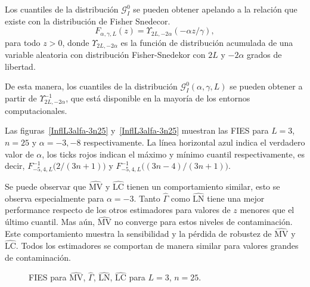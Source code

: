 Los cuantiles de la distribución $\mathcal{G}_I^0$ se pueden obtener apelando a la relación que existe con la distribución de Fisher Snedecor.
\begin{equation}
F_{\alpha,\gamma,L}(z) = \Upsilon_{2L, -2\alpha}(-\alpha  z / \gamma),
\label{eq:CDFG0}
\end{equation}
para todo $z>0$, donde $\Upsilon_{2L, -2\alpha}$ es la función de distribución acumulada de una variable aleatoria con distribución Fisher-Snedekor con $2L$ y $-2\alpha$ grados de libertad.

De esta manera, los cuantiles de la distribución $\mathcal{G}_I^0(\alpha,\gamma,L)$ se pueden obtener a partir de $\Upsilon^{-1}_{2L,-2\alpha}$, que está disponible en la mayoría de los entornos computacionales.

Las figuras~\ref{InflL3alfa-3n25} y~\ref{InflL3alfa-3n25} muestran las FIES para $L=3$, $n=25$ y $\alpha=-3, -8$ respectivamente. La línea horizontal azul indica el verdadero valor de $\alpha$, los ticks rojos indican el máximo y mínimo cuantil respectivamente, es decir, $F^{-1}_{-5,4,L}\big(2/(3n+1)\big)$ y $F^{-1}_{-5,4,L}\big((3n-4)/(3n+1)\big)$. 

Se puede observar que $\widehat{\text{MV}}$ y $\widehat{\text{LC}}$ tienen un comportamiento similar, esto se observa especialmente para $\alpha=-3$. Tanto $\widehat{\Gamma}$ como $\widehat{\text{LN}}$ tiene una mejor performance respecto de los otros estimadores para valores de $z$ menores que el último cuantil. Mas aún, $\widehat{\text{MV}}$ no converge para estos niveles de contaminación. Este comportamiento muestra la sensibilidad y la pérdida de robustez de $\widehat{\text{MV}}$ y $\widehat{\text{LC}}$. Todos los estimadores se comportan de manera similar para valores grandes de contaminación.

\begin{figure}[htb]
	\caption{\label{InflL3n25}\small FIES para $\widehat{\text{MV}}$, $\widehat{\Gamma}$, $\widehat{\text{LN}}$, $\widehat{\text{LC}}$ para $L=3$, $n=25$.}
\end{figure}
